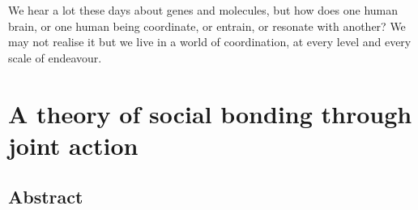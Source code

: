 
\begin{savequote}[8cm]

    We hear a lot these days about genes and molecules, but how does one human brain, or one human being coordinate, or entrain, or resonate with another?  We may not realise it but we live in a world of coordination, at every level and every scale of endeavour.

\end{savequote}




\chapter{\label{theoryContribution}A theory of social bonding through joint action}


\minitoc

\section{Abstract}



